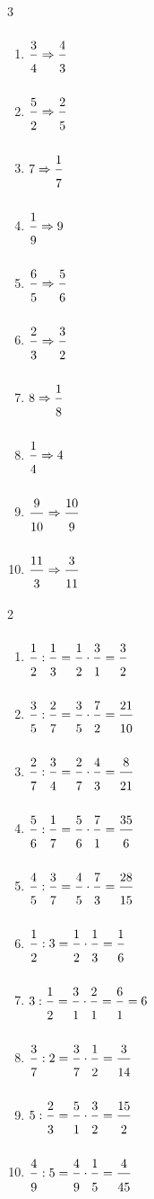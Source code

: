 \ExoC
\begin{multicols}{3}
\begin{enumerate}[leftmargin=*,align=parleft, label=\alph*), itemsep=6pt, topsep=2pt]
\item $\FA{3}{4}\Rightarrow \FA{4}{3}$
\item $\FA{5}{2}\Rightarrow \FA{2}{5}$
\item $7\Rightarrow \FA{1}{7}$
\item $\FA{1}{9}\Rightarrow 9$
\item $\FA{6}{5}\Rightarrow \FA{5}{6}$
\item $\FA{2}{3}\Rightarrow \FA{3}{2}$
\item $8\Rightarrow \FA{1}{8}$
\item $\FA{1}{4}\Rightarrow 4$
\item $\FA{9}{10}\Rightarrow \FA{10}{9}$
\item $\FA{11}{3}\Rightarrow \FA{3}{11}$
\end{enumerate}
\end{multicols}
 
\ExoC
\begin{multicols}{2}
\begin{enumerate}[leftmargin=*,align=parleft, label=\alph*), itemsep=6pt, topsep=2pt]
\item $\FA{1}{2}:\FA{1}{3}=\FA{1}{2}\cdot\FA{3}{1}=\FA{3}{2}$
\item $\FA{3}{5}:\FA{2}{7}=\FA{3}{5}\cdot\FA{7}{2}=\FA{21}{10}$
\item $\FA{2}{7}:\FA{3}{4}=\FA{2}{7}\cdot\FA{4}{3}=\FA{8}{21}$
\item $\FA{5}{6}:\FA{1}{7}=\FA{5}{6}\cdot\FA{7}{1}=\FA{35}{6}$
\item $\FA{4}{5}:\FA{3}{7}=\FA{4}{5}\cdot\FA{7}{3}=\FA{28}{15}$
\item $\FA{1}{2}:3=\FA{1}{2}\cdot\FA{1}{3}=\FA{1}{6}$
\item $3:\FA{1}{2}=\FA{3}{1}\cdot\FA{2}{1}=\FA{6}{1}=6$
\item $\FA{3}{7}:2=\FA{3}{7}\cdot\FA{1}{2}=\FA{3}{14}$
\item $5:\FA{2}{3}=\FA{5}{1}\cdot\FA{3}{2}=\FA{15}{2}$
\item $\FA{4}{9}:5=\FA{4}{9}\cdot\FA{1}{5}=\FA{4}{45}$
\end{enumerate}
\end{multicols}
 
